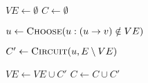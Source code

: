 
\begin{algorithm}[H]
  \begin{algorithmic}
    \State $VE \gets \emptyset$	
    \State $C \gets \emptyset$	

    \Statex
      \State $u \gets \Call{Choose}{u : (u \to v) \notin VE}$

      \hStatex
      \State $C' \gets \Call{Circuit}{u, E \setminus VE}$

      \hStatex
      \State $VE \gets VE \cup C'$
      \State $C \gets C \cup C'$
    \EndWhile
  \end{algorithmic}
\end{algorithm}
